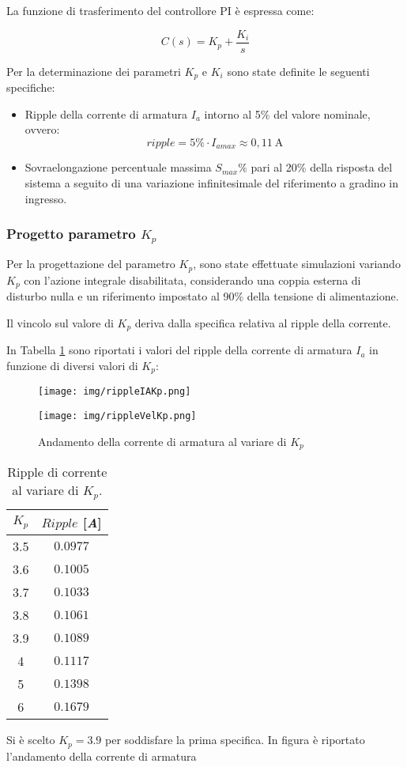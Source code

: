\documentclass{article}
\begin{document}
La funzione di trasferimento del controllore PI è espressa come:

\[
C(s) = K_p + \frac{K_i}{s}
\]

Per la determinazione dei parametri $K_p$ e $K_i$ sono state definite le seguenti specifiche:

\begin{itemize}
    \item Ripple della corrente di armatura $I_a$ intorno al 5\% del valore nominale, ovvero:
    \[
    ripple = 5\% \cdot I_{amax} \approx 0{,}11~\text{A}
    \]
    \item Sovraelongazione percentuale massima $S_{max}\%$ pari al 20\% della risposta del sistema a seguito di una variazione infinitesimale del riferimento a gradino in ingresso.
\end{itemize}

\subsubsection{Progetto parametro $K_p$}
Per la progettazione del parametro $K_p$, sono state effettuate simulazioni variando $K_p$ con l’azione integrale disabilitata, considerando una coppia esterna di disturbo nulla e un riferimento impostato al 90\% della tensione di alimentazione. 

Il vincolo sul valore di $K_p$ deriva dalla specifica relativa al ripple della corrente. 

In Tabella \ref{tab:3} sono riportati i valori del ripple della corrente di armatura $I_a$ in funzione di diversi valori di $K_p$:


\begin{figure}[h!]
\centering
\texttt{[image: img/rippleIAKp.png]}
\end{figure}
\begin{figure}[h!]
    \centering
    \texttt{[image: img/rippleVelKp.png]}
\caption{Andamento della corrente di armatura al variare di $K_p$}
\label{fig:simkp}
\end{figure}

\begin{table}[h!]
\centering
\begin{tabular}{ |c|c| } 
  \hline
  $K_p$ & $Ripple$ [\textit{A}] \\ 
  \hline
  3.5 & $0.0977$  \\ 
  \hline
  3.6 & $0.1005$ \\
  \hline
  3.7 & $0.1033$  \\ 
  \hline
  3.8 & $0.1061$ \\
  \hline
  3.9 & $0.1089$  \\ 
  \hline
  4 & $0.1117$ \\
  \hline
  5 & $0.1398$  \\ 
  \hline
  6 & $0.1679$  \\ 
  \hline
\end{tabular}
\caption{\label{tab:3}Ripple di corrente al variare di $K_p$.}
\end{table}
\newpage
Si è scelto $K_p=3.9$ per soddisfare la prima specifica. In figura è riportato l'andamento della corrente di armatura
\end{document}
